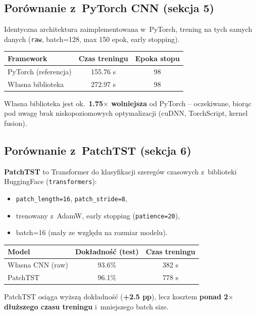 \documentclass[12pt,a4paper]{article}
\begin{document}
\subsection{Porównanie z~PyTorch CNN (sekcja 5)}

Identyczna architektura zaimplementowana w~PyTorch, trening na tych samych danych (\texttt{raw}, batch=128, max 150 epok, early stopping).

\begin{center}
\begin{tabular}{@{}lcc@{}}
\toprule
Framework & Czas treningu & Epoka stopu \\
\midrule
PyTorch (referencja) & 155.76 s & 98 \\
Własna biblioteka    & 272.97 s & 98 \\
\bottomrule
\end{tabular}
\end{center}

Własna biblioteka jest ok.\ \textbf{1.75$\times$ wolniejsza} od PyTorch -- oczekiwane, biorąc pod uwagę brak niskopoziomowych optymalizacji (cuDNN, TorchScript, kernel fusion).

\subsection{Porównanie z~PatchTST (sekcja 6)}

\textbf{PatchTST} to Transformer do klasyfikacji szeregów czasowych z~biblioteki HuggingFace (\texttt{transformers}):
\begin{itemize}
  \item \texttt{patch\_length=16}, \texttt{patch\_stride=8},
  \item trenowany z~AdamW, early stopping (\texttt{patience=20}),
  \item batch=16 (mały ze względu na rozmiar modelu).
\end{itemize}

\begin{center}
\begin{tabular}{@{}lcc@{}}
\toprule
Model & Dokładność (test) & Czas treningu \\
\midrule
Własna CNN (raw)  & 93.6\%  & 382 s \\
PatchTST          & 96.1\%  & 778 s \\
\bottomrule
\end{tabular}
\end{center}

PatchTST osiąga wyższą dokładność (\textbf{+2.5 pp}), lecz kosztem \textbf{ponad 2$\times$ dłuższego czasu treningu} i~mniejszego batch size.
\end{document}
